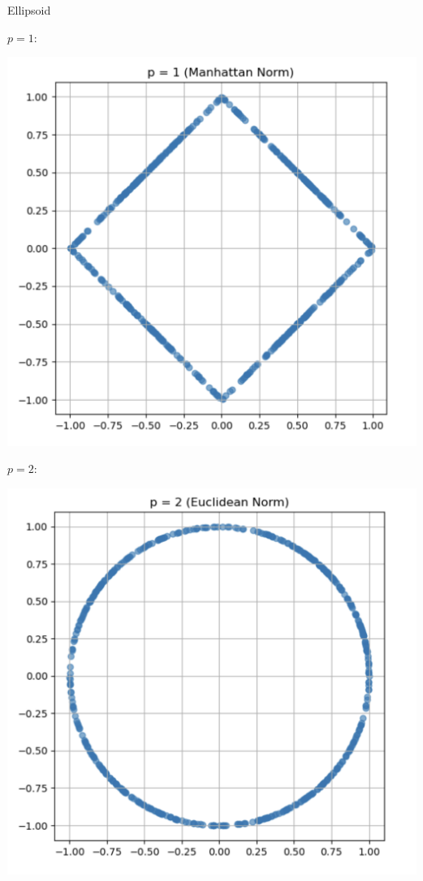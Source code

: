 \begin{ex}[Ellipsoid]{Ellipsoid}
    \begin{itemize}
        \begin{minipage}{0.33\textwidth}
            \item 
                $p = 1$: 
                \begin{center}
                    \hspace{-1.5cm}\includegraphics[scale = 0.2]{Images/Fundamental/ManhattanBall.png}
                \end{center}
        \end{minipage}
        \begin{minipage}{0.33\textwidth}
            \item 
                $p = 2$: 
                \begin{center}
                    \hspace{-1.5cm}\includegraphics[scale = 0.2]{Images/Fundamental/EuclideanBall.png}

\end{center}
\end{minipage}
\end{itemize}
\end{ex}
